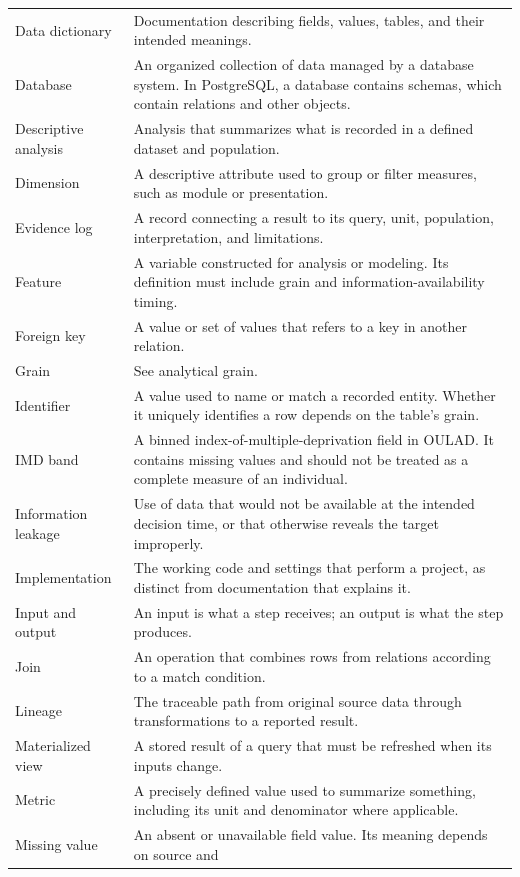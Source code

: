 \begin{longtable}{@{}p{}p{}@{}}
Data dictionary &
Documentation describing fields, values, tables, and their intended meanings. \\
Database &
An organized collection of data managed by a database system. In PostgreSQL, a
database contains schemas, which contain relations and other objects. \\
Descriptive analysis &
Analysis that summarizes what is recorded in a defined dataset and population. \\
Dimension &
A descriptive attribute used to group or filter measures, such as module or
presentation. \\
Evidence log &
A record connecting a result to its query, unit, population, interpretation,
and limitations. \\
Feature &
A variable constructed for analysis or modeling. Its definition must include
grain and information-availability timing. \\
Foreign key &
A value or set of values that refers to a key in another relation. \\
Grain &
See analytical grain. \\
Identifier &
A value used to name or match a recorded entity. Whether it uniquely identifies
a row depends on the table's grain. \\
IMD band &
A binned index-of-multiple-deprivation field in OULAD. It contains missing
values and should not be treated as a complete measure of an individual. \\
Information leakage &
Use of data that would not be available at the intended decision time, or that
otherwise reveals the target improperly. \\
Implementation &
The working code and settings that perform a project, as distinct from
documentation that explains it. \\
Input and output &
An input is what a step receives; an output is what the step produces. \\
Join &
An operation that combines rows from relations according to a match condition. \\
Lineage &
The traceable path from original source data through transformations to a
reported result. \\
Materialized view &
A stored result of a query that must be refreshed when its inputs change. \\
Metric &
A precisely defined value used to summarize something, including its unit and
denominator where applicable. \\
Missing value &
An absent or unavailable field value. Its meaning depends on source and

\end{longtable}
